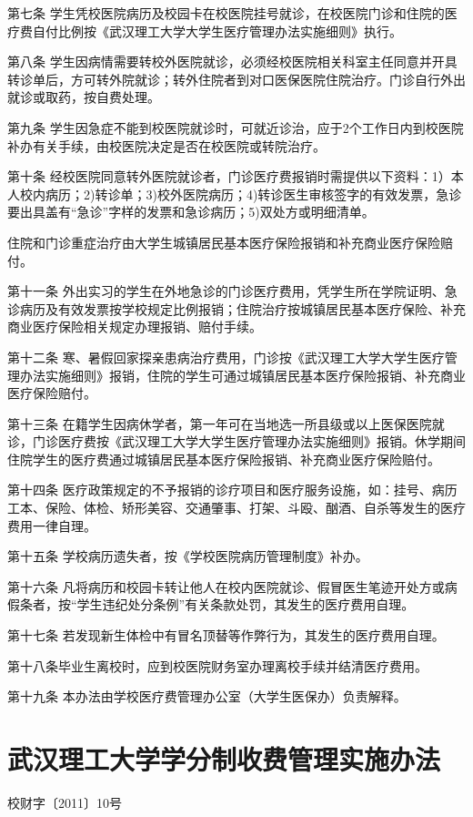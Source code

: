 \documentclass[UTF8,12pt,a4paper]{report}
\begin{document}
第七条 学生凭校医院病历及校园卡在校医院挂号就诊，在校医院门诊和住院的医疗费自付比例按《武汉理工大学大学生医疗管理办法实施细则》执行。

第八条 学生因病情需要转校外医院就诊，必须经校医院相关科室主任同意并开具转诊单后，方可转外院就诊；转外住院者到对口医保医院住院治疗。门诊自行外出就诊或取药，按自费处理。

第九条 学生因急症不能到校医院就诊时，可就近诊治，应于2个工作日内到校医院补办有关手续，由校医院决定是否在校医院或转院治疗。

第十条 经校医院同意转外医院就诊者，门诊医疗费报销时需提供以下资料：1）本人校内病历；2)转诊单；3)校外医院病历；4)转诊医生审核签字的有效发票，急诊要出具盖有“急诊”字样的发票和急诊病历；5)双处方或明细清单。

住院和门诊重症治疗由大学生城镇居民基本医疗保险报销和补充商业医疗保险赔付。

第十一条 外出实习的学生在外地急诊的门诊医疗费用，凭学生所在学院证明、急诊病历及有效发票按学校规定比例报销；住院治疗按城镇居民基本医疗保险、补充商业医疗保险相关规定办理报销、赔付手续。

第十二条 寒、暑假回家探亲患病治疗费用，门诊按《武汉理工大学大学生医疗管理办法实施细则》报销，住院的学生可通过城镇居民基本医疗保险报销、补充商业医疗保险赔付。

第十三条 在籍学生因病休学者，第一年可在当地选一所县级或以上医保医院就诊，门诊医疗费按《武汉理工大学大学生医疗管理办法实施细则》报销。休学期间住院学生的医疗费通过城镇居民基本医疗保险报销、补充商业医疗保险赔付。

第十四条 医疗政策规定的不予报销的诊疗项目和医疗服务设施，如：挂号、病历工本、保险、体检、矫形美容、交通肇事、打架、斗殴、酗酒、自杀等发生的医疗费用一律自理。

第十五条 学校病历遗失者，按《学校医院病历管理制度》补办。

第十六条 凡将病历和校园卡转让他人在校内医院就诊、假冒医生笔迹开处方或病假条者，按“学生违纪处分条例”有关条款处罚，其发生的医疗费用自理。

第十七条 若发现新生体检中有冒名顶替等作弊行为，其发生的医疗费用自理。

第十八条毕业生离校时，应到校医院财务室办理离校手续并结清医疗费用。

第十九条 本办法由学校医疗费管理办公室（大学生医保办）负责解释。

\chapter{武汉理工大学学分制收费管理实施办法}
校财字〔2011〕10号
\end{document}
